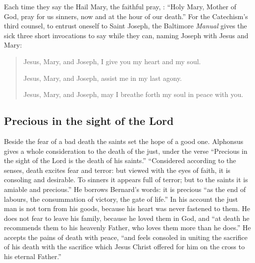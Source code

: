 Each time they say the Hail Mary, the faithful pray, : ``Holy Mary, Mother of God, pray for us sinners, now and at the hour of our death.'' For the Catechism's third counsel, to entrust oneself to Saint Joseph, the Baltimore \emph{Manual} gives the sick three short invocations to say while they can, naming Joseph with Jesus and Mary:

\begin{quote}
Jesus, Mary, and Joseph, I give you my heart and my soul.

Jesus, Mary, and Joseph, assist me in my last agony.

Jesus, Mary, and Joseph, may I breathe forth my soul in peace with you.
\end{quote}

\subsection{Precious in the sight of the Lord}

Beside the fear of a bad death the saints set the hope of a good one. Alphonsus gives a whole consideration to the death of the just, under the verse ``Precious in the sight of the Lord is the death of his saints.'' ``Considered according to the senses, death excites fear and terror: but viewed with the eyes of faith, it is consoling and desirable. To sinners it appears full of terror; but to the saints it is amiable and precious.'' He borrows Bernard's words: it is precious ``as the end of labours, the consummation of victory, the gate of life.'' In his account the just man is not torn from his goods, because his heart was never fastened to them. He does not fear to leave his family, because he loved them in God, and ``at death he recommends them to his heavenly Father, who loves them more than he does.'' He accepts the pains of death with peace, ``and feels consoled in uniting the sacrifice of his death with the sacrifice which Jesus Christ offered for him on the cross to his eternal Father.''

